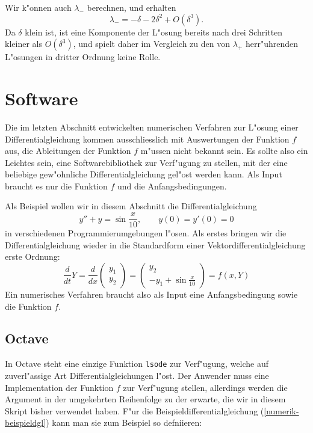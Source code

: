 Wir k"onnen auch $\lambda_-$ berechnen, und erhalten
\[
\lambda_-=-\delta-2\delta^2+O(\delta^3).
\]
Da $\delta$ klein ist, ist eine Komponente der L"osung bereits nach
drei Schritten kleiner als $O(\delta^3)$, und spielt daher im Vergleich
zu den von $\lambda_+$ herr"uhrenden L"osungen in dritter Ordnung keine
Rolle.

\section{Software}
Die im letzten Abschnitt entwickelten numerischen Verfahren zur L"osung
einer Differentialgleichung kommen ausschliesslich mit Auswertungen der
Funktion $f$ aus, die Ableitungen der Funktion $f$ m"ussen nicht bekannt
sein.
Es sollte also ein Leichtes sein, eine Softwarebibliothek zur
Verf"ugung zu stellen, mit der eine beliebige gew"ohnliche
Differentialgleichung gel"ost werden kann.
Als Input braucht es nur die Funktion $f$ und die Anfangsbedingungen.

Als Beispiel wollen wir in diesem Abschnitt die Differentialgleichung
\[
y''+y=\sin \frac{x}{10},\qquad y(0)=y'(0)=0
\]
in verschiedenen Programmierumgebungen l"osen.
Als erstes bringen wir die Differentialgleichung wieder in die Standardform
einer Vektordifferentialgleichung erste Ordnung:
\begin{equation}
\frac{d}{dt}Y
=
\frac{d}{dx}\begin{pmatrix}y_1\\y_2\end{pmatrix}
=
\begin{pmatrix}
y_2\\
-y_1+\sin\frac{x}{10}
\end{pmatrix}
=
f(x,Y)
\label{numerik-beispieldgl}
\end{equation}
Ein numerisches Verfahren braucht also als Input eine Anfangsbedingung
sowie die Funktion $f$.

\subsection{Octave}
In Octave steht eine einzige Funktion \texttt{lsode} zur Verf"ugung, welche
auf zuverl"assige Art Differentialgleichungen l"ost.
Der Anwender muss eine Implementation der Funktion $f$ zur Verf"ugung
stellen, allerdings werden die Argument in der umgekehrten Reihenfolge
zu der erwarte, die wir in diesem Skript bisher verwendet haben.
F"ur die Beispieldifferentialgleichung (\ref{numerik-beispieldgl})
kann man sie zum Beispiel so defniieren:


